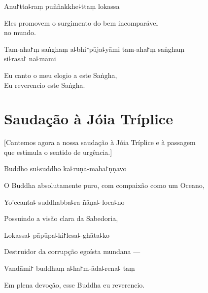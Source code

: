 Anu꜓tta꜕raṃ puññakkhe꜕ttaṃ lokassa

\begin{english}
  Eles promovem o surgimento do bem incomparável \\no mundo.
\end{english}

Tam-aha꜓ṃ saṅghaṃ a꜕bhi꜓pūja꜕yāmi tam-aha꜓ṃ saṅghaṃ \\si꜕rasā꜓ na꜕māmi

\begin{english}
  Eu canto o meu elogio a este Saṅgha,\\
  Eu reverencio este Saṅgha.
\end{english}

\clearpage

\chapter{Saudação à Jóia Tríplice}

\begin{leader}
\end{leader}

\begin{english}
  [Cantemos agora a nossa saudação à Jóia Tríplice e à passagem \\que estimula o sentido de urgência.]
\end{english}

Buddho su꜕suddho ka꜕ruṇā-maha꜓ṇṇavo

\begin{english}
  O Buddha absolutamente puro, com compaixão como um Oceano,
\end{english}

Yo'ccanta꜕-suddhabba꜕ra-ñāṇa꜕-loca꜕no

\begin{english}
 Possuindo a visão clara da Sabedoria,
\end{english}

Lokassa꜕ pāpūpa꜕ki꜓lesa꜕-ghāta꜕ko

\begin{english}
  Destruidor da corrupção egoísta mundana ---
\end{english}

Vandāmi꜓ buddhaṃ a꜕ha꜓m-āda꜕rena꜕ taṃ

\begin{english}
  Em plena devoção, esse Buddha eu reverencio.
\end{english}


